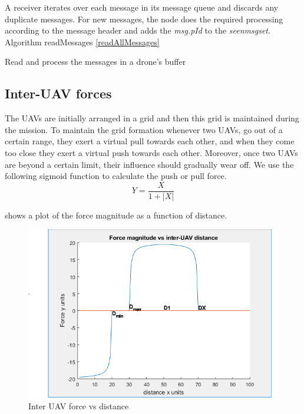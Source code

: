 A receiver iterates over each message in its message queue and discards any duplicate messages. For new messages, the node does the required processing according to the message header and adds the \emph{msg.pId} to the \emph{seen\textunderscore msg\textunderscore set}. Algorithm readMessages \ref{readAllMessages}

\begin{algorithm}
    \caption{Read and process the messages in a drone's buffer} 
    \label{readAllMessages}
    \DontPrintSemicolon
    
\end{algorithm}

\subsection{Inter-UAV forces}
The UAVs are initially arranged in a grid and then this grid is maintained during the mission. To maintain the grid formation whenever two UAVs, go out of a certain range, they exert a virtual pull towards each other, and when they come too close they exert a virtual push towards each other. Moreover, once two UAVs are beyond a certain limit, their influence should gradually wear off. We use the following sigmoid function to calculate the push or pull force. 
\begin{equation}
    Y = \frac{X}{1 + |X|}
\end{equation}

 shows a plot of the force magnitude as a function of distance.

\begin{figure}
\centering
\includegraphics[width=1\textwidth]{ncsuthesis-0.6/Chapter-4/figs/force_function}
\caption{Inter UAV force vs distance}
\label{fig:force_fn}
\end{figure}


